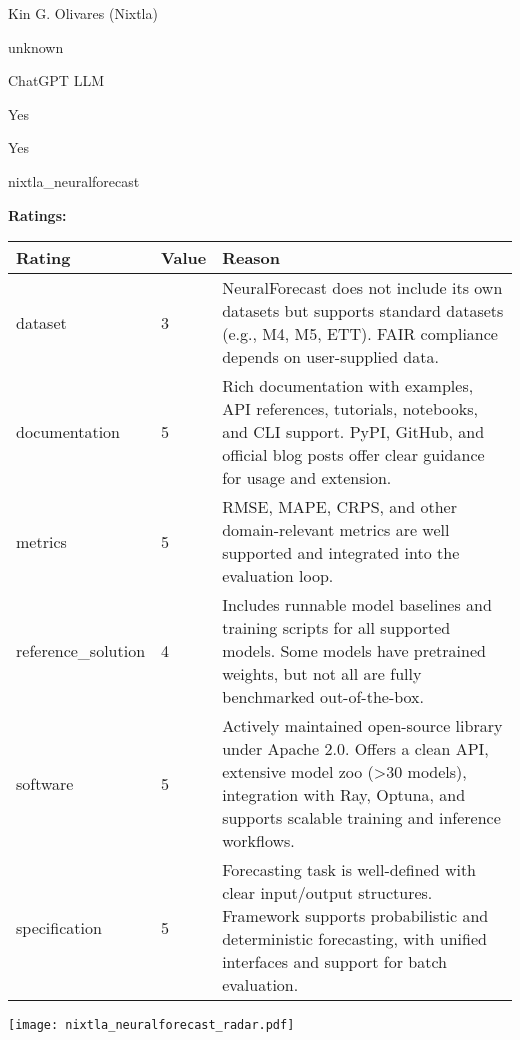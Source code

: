 {{\begin{description}[labelwidth=4cm, labelsep=1em, leftmargin=4cm, itemsep=0.1em, parsep=0em]
  \item[contact.name:] Kin G. Olivares (Nixtla)
  \item[contact.email:] unknown
  \item[results.links.name:] ChatGPT LLM
  \item[fair.reproducible:] Yes
  \item[fair.benchmark\_ready:] Yes
  \item[id:] nixtla\_neuralforecast
  \item[Citations:] \cite{olivares2022library_neuralforecast}
\end{description}

{\bf Ratings:} ~ \\

\begin{tabular}{p{} p{} p{}}
\hline
Rating & Value & Reason \\
\hline
dataset & 3 & NeuralForecast does not include its own datasets but supports standard datasets (e.g., M4, M5, ETT).
FAIR compliance depends on user-supplied data.
 \\
documentation & 5 & Rich documentation with examples, API references, tutorials, notebooks, and CLI support.
PyPI, GitHub, and official blog posts offer clear guidance for usage and extension.
 \\
metrics & 5 & RMSE, MAPE, CRPS, and other domain-relevant metrics are well supported and integrated into the evaluation loop.
 \\
reference\_solution & 4 & Includes runnable model baselines and training scripts for all supported models.
Some models have pretrained weights, but not all are fully benchmarked out-of-the-box.
 \\
software & 5 & Actively maintained open-source library under Apache 2.0. Offers a clean API,
extensive model zoo (>30 models), integration with Ray, Optuna, and supports
scalable training and inference workflows.
 \\
specification & 5 & Forecasting task is well-defined with clear input/output structures. Framework supports
probabilistic and deterministic forecasting, with unified interfaces and support for batch evaluation.
 \\
\hline
\end{tabular}

\texttt{[image: nixtla\_neuralforecast\_radar.pdf]}
}}
\clearpage